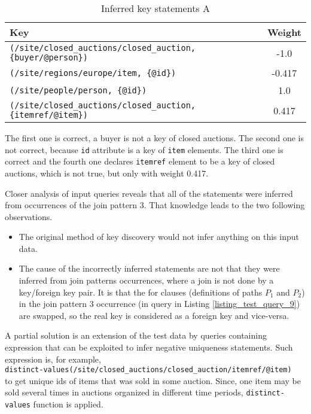\begin{table}
\begin{tabular}{|l|c|}
\hline
\textbf{Key} & \textbf{Weight} \\ \hline \hline
\texttt{(/site/closed\_auctions/closed\_auction, \{buyer/@person\})} & -1.0 \\ \hline
\texttt{(/site/regions/europe/item, \{@id\})} & -0.417 \\ \hline
\texttt{(/site/people/person, \{@id\})} & 1.0 \\ \hline
\texttt{(/site/closed\_auctions/closed\_auction, \{itemref/@item\})} & 0.417 \\ \hline
\end{tabular}
\caption{Inferred key statements A}
\label{TAB_inferred_keys}
\end{table}

The first one is correct, a buyer is not a key of closed auctions. The second one is not correct, because \texttt{id} attribute is a key of \texttt{item} elements. The third one is correct and the fourth one declares \texttt{itemref} element to be a key of closed auctions, which is not true, but only with weight 0.417.

Closer analysis of input queries reveals that all of the statements were inferred from occurrences of the join pattern 3. That knowledge leads to the two following observations.

\begin{itemize}
\item The original method of key discovery would not infer anything on this input data.
\item The cause of the incorrectly inferred statements are not that they were inferred from join patterns occurrences, where a join is not done by a key/foreign key pair. It is that the for clauses (definitions of paths $P_1$ and $P_2$) in the join pattern 3 occurrence (in query in Listing \ref{listing_test_query_9}) are swapped, so the real key is considered as a foreign key and vice-versa.
\end{itemize}

A partial solution is an extension of the test data by queries containing expression that can be exploited to infer negative uniqueness statements. Such expression is, for example,\\ \texttt{distinct-values(/site/closed\_auctions/closed\_auction/itemref/@item)}\\ to get unique ids of items that was sold in some auction. Since, one item may be sold several times in auctions organized in different time periods, \texttt{distinct-values} function is applied.

